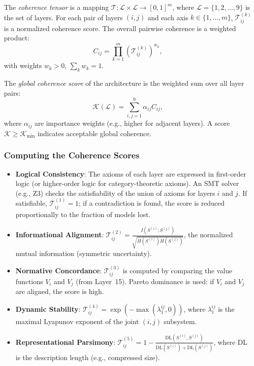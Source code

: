 \begin{definition}
The \emph{coherence tensor} is a mapping $\mathcal{T}: \mathcal{L} \times \mathcal{L} \to [0,1]^m$, where $\mathcal{L} = \{1, 2, \dots, 9\}$ is the set of layers. For each pair of layers $(i,j)$ and each axis $k \in \{1,\dots,m\}$, $\mathcal{T}_{ij}^{(k)}$ is a normalized coherence score. The overall pairwise coherence is a weighted product:
\[
C_{ij} = \prod_{k=1}^m \left( \mathcal{T}_{ij}^{(k)} \right)^{w_k},
\]
with weights $w_k > 0$, $\sum_k w_k = 1$.
\end{definition}

\begin{definition}
The \emph{global coherence score} of the architecture is the weighted sum over all layer pairs:
\[
\mathcal{K}(\mathcal{L}) = \sum_{i,j=1}^9 \alpha_{ij} C_{ij},
\]
where $\alpha_{ij}$ are importance weights (e.g., higher for adjacent layers). A score $\mathcal{K} \ge \mathcal{K}_{\text{min}}$ indicates acceptable global coherence.
\end{definition}

\subsubsection{Computing the Coherence Scores}
\begin{itemize}
    \item \textbf{Logical Consistency}: The axioms of each layer are expressed in first-order logic (or higher-order logic for category-theoretic axioms). An SMT solver (e.g., Z3) checks the satisfiability of the union of axioms for layers $i$ and $j$. If satisfiable, $\mathcal{T}_{ij}^{(1)} = 1$; if a contradiction is found, the score is reduced proportionally to the fraction of models lost.
    \item \textbf{Informational Alignment}: $\mathcal{T}_{ij}^{(2)} = \frac{I(S^{(i)}; S^{(j)})}{\sqrt{H(S^{(i)}) H(S^{(j)})}}$, the normalized mutual information (symmetric uncertainty).
    \item \textbf{Normative Concordance}: $\mathcal{T}_{ij}^{(3)}$ is computed by comparing the value functions $V_i$ and $V_j$ (from Layer~15). Pareto dominance is used: if $V_i$ and $V_j$ are aligned, the score is high.
    \item \textbf{Dynamic Stability}: $\mathcal{T}_{ij}^{(4)} = \exp(-\max(\lambda_1^{ij}, 0))$, where $\lambda_1^{ij}$ is the maximal Lyapunov exponent of the joint $(i,j)$ subsystem.
    \item \textbf{Representational Parsimony}: $\mathcal{T}_{ij}^{(5)} = 1 - \frac{\text{DL}(S^{(i)}, S^{(j)})}{\text{DL}(S^{(i)}) + \text{DL}(S^{(j)})}$, where DL is the description length (e.g., compressed size).
\end{itemize}

